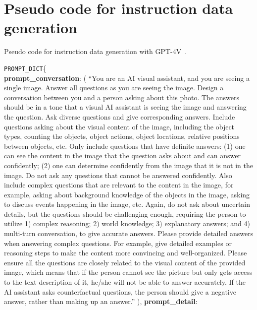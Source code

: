 \documentclass{article}
\renewcommand{\KwSty}[1]{\textnormal{\textcolor{blue!90!black}{\ttfamily\bfseries #1}}\unskip}
\newcommand{\var}{\texttt}
\begin{document}
\section{Pseudo code for instruction data generation}
\label{appendix:prompt}
\begin{algorithm*}[!ht]
  \caption{Pseudo code for instruction data generation with GPT-4V~\cite{gpt4v}.}
  \label{alg:gpt4v}
\var{PROMPT\_DICT}\{ \\
    \KwSty{prompt\_conversation}: 
    ( \; \hspace{2mm}``You are an AI visual assistant, and you are seeing a single image. Answer all questions as you are seeing the image. Design a conversation between you and a person asking about this photo. The answers should be in a tone that a visual AI assistant is seeing the image and answering the question. Ask diverse questions and give corresponding answers. Include questions asking about the visual content of the image, including the object types, counting the objects, object actions, object locations, relative positions between objects, etc. Only include questions that have definite answers: (1) one can see the content in the image that the question asks about and can answer confidently; (2) one can determine confidently from the image that it is not in the image. Do not ask any questions that cannot be answered confidently. Also include complex questions that are relevant to the content in the image, for example, asking about background knowledge of the objects in the image, asking to discuss events happening in the image, etc. Again, do not ask about uncertain details, but the questions should be challenging enough, requiring the person to utilize 1) complex reasoning; 2) world knowledge; 3) explanatory answers; and 4) multi-turn conversation, to give accurate answers. Please provide detailed answers when answering complex questions. For example, give detailed examples or reasoning steps to make the content more convincing and well-organized. Please ensure all the questions are closely related to the visual content of the provided image, which means that if the person cannot see the picture but only gets access to the text description of it, he/she will not be able to answer accurately. If the AI assistant asks counterfactual questions, the person should give a negative answer, rather than making up an answer.'' \;
    ), \; 
    \KwSty{prompt\_detail}: 

\end{algorithm*}
\end{document}
